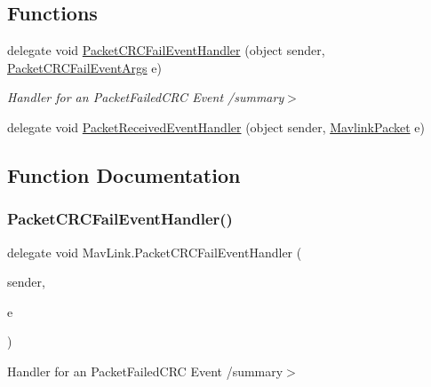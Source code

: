 \subsection*{Functions}
\begin{DoxyCompactItemize}
\item 
delegate void \mbox{\hyperlink{namespaceMavLink_a8ed8a6701876b63e5bb9135a9897d679}{Packet\+C\+R\+C\+Fail\+Event\+Handler}} (object sender, \mbox{\hyperlink{classMavLink_1_1PacketCRCFailEventArgs}{Packet\+C\+R\+C\+Fail\+Event\+Args}} e)
\begin{DoxyCompactList}\small\item\em Handler for an Packet\+Failed\+C\+RC Event /summary$>$ \end{DoxyCompactList}\item 
delegate void \mbox{\hyperlink{namespaceMavLink_a78c17c9f049257b0626c8d377735666d}{Packet\+Received\+Event\+Handler}} (object sender, \mbox{\hyperlink{classMavLink_1_1MavlinkPacket}{Mavlink\+Packet}} e)
\end{DoxyCompactItemize}


\subsection{Function Documentation}
\mbox{\label{namespaceMavLink_a8ed8a6701876b63e5bb9135a9897d679}} 
\subsubsection{\texorpdfstring{PacketCRCFailEventHandler()}{PacketCRCFailEventHandler()}}
{\footnotesize\ttfamily delegate void Mav\+Link.\+Packet\+C\+R\+C\+Fail\+Event\+Handler (\begin{DoxyParamCaption}\item[{object}]{sender,  }\item[{\mbox{\hyperlink{classMavLink_1_1PacketCRCFailEventArgs}{Packet\+C\+R\+C\+Fail\+Event\+Args}}}]{e }\end{DoxyParamCaption})}



Handler for an Packet\+Failed\+C\+RC Event /summary$>$ 

\mbox{\label{namespaceMavLink_a78c17c9f049257b0626c8d377735666d}} 
